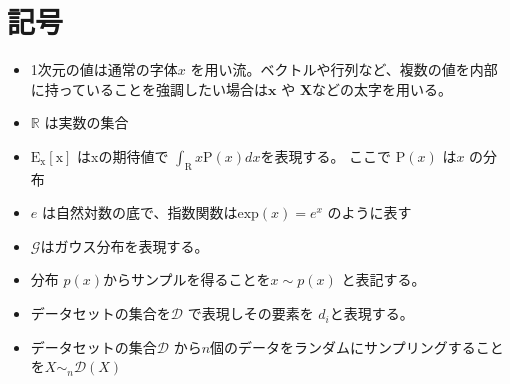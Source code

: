 \chapter*{記号}
\label{thanks}


\begin{itemize}
    \item 1次元の値は通常の字体$ x $ を用い流。ベクトルや行列など、複数の値を内部に持っていることを強調したい場合は$ \mathbf{x} $ や $ \mathbf{X} $などの太字を用いる。
    \item $\mathbb{R}$ は実数の集合
    \item $\mathrm{E_x[x]}$ はxの期待値で $ \int_{\mathrm{R}} x \mathrm{P}(x) dx $を表現する。 ここで $ \mathrm{P}(x) $ は$ x $ の分布
    \item $e$ は自然対数の底で、指数関数は$\mathrm{exp}(x) = e^x$ のように表す
    \item $ \mathcal{G} $はガウス分布を表現する。
    \item 分布 $p(x)$からサンプルを得ることを$ x \sim p(x) $ と表記する。
    \item データセットの集合を$ \mathcal{D} $ で表現しその要素を $ d_i $と表現する。
    \item データセットの集合$ \mathcal{D} $ から$ n $個のデータをランダムにサンプリングすることを$ X \sim_n \mathcal{D}(X) $ 

\end{itemize}